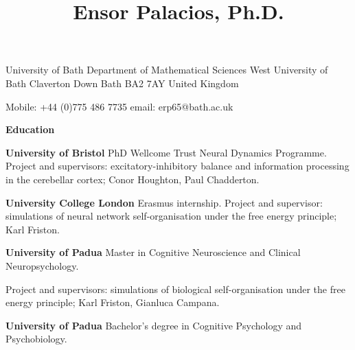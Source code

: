 \documentclass[11pt,usenames, dvipsnames]{article}
\title{\bfseries Ensor Palacios, Ph.D.}
\begin{document}
\date{\vspace{5ex}}   %
\maketitle
\vspace{-70pt}
\medskip

University of Bath\newline
Department of Mathematical Sciences West University of Bath Claverton Down Bath BA2 7AY United Kingdom\newline

Mobile: +44 (0)775 486 7735\newline
email: erp65@bath.ac.uk

\vspace{1.2cm}

{\large \bfseries \color{color_64493} Education}\newline
\vspace{1pt}

 {\bfseries University of Bristol} \newline PhD Wellcome Trust Neural Dynamics Programme.\newline 
Project and supervisors: excitatory-inhibitory balance and information processing in the cerebellar cortex; Conor Houghton, Paul Chadderton. \newline
\vspace{-5pt}

 {\bfseries University College London} \newline Erasmus internship.\newline 
Project and supervisor: simulations of neural network self-organisation under the free energy principle; Karl Friston.
\vspace{7pt}

 {\bfseries University of Padua} \newline Master in Cognitive Neuroscience and Clinical Neuropsychology.
\vspace{7pt}

Project and supervisors: simulations of biological self-organisation under the free energy principle; Karl Friston, Gianluca Campana. 
\vspace{7pt}

 {\bfseries University of Padua} \newline Bachelor's degree in Cognitive Psychology and Psychobiology.
\vspace{1.2cm}
\end{document}
